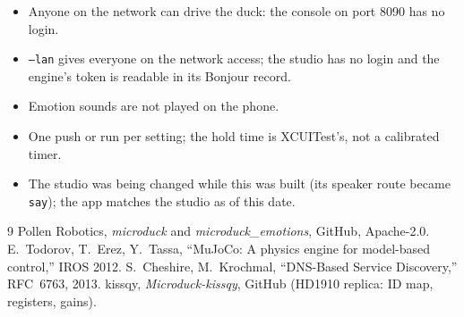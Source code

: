 \documentclass[11pt]{article}
\begin{document}
\begin{itemize}
kick has no policy installed on this duck; the runtime will refuse it.
\item Anyone on the network can drive the duck: the console on port 8090 has no login.
\item \texttt{--lan} gives everyone on the network access; the studio has no login and the engine's token is
readable in its Bonjour record.
\item Emotion sounds are not played on the phone.
\item One push or run per setting; the hold time is XCUITest's, not a calibrated timer.
\item The studio was being changed while this was built (its speaker route became \texttt{say}); the app matches
the studio as of this date.
\end{itemize}

\begin{thebibliography}{9}
 Pollen Robotics, \emph{microduck} and \emph{microduck\_emotions}, GitHub, Apache-2.0.
 E.~Todorov, T.~Erez, Y.~Tassa, ``MuJoCo: A physics engine for model-based control,'' IROS 2012.
 S.~Cheshire, M.~Krochmal, ``DNS-Based Service Discovery,'' RFC~6763, 2013.
 kissqy, \emph{Microduck-kissqy}, GitHub (HD1910 replica: ID map, registers, gains).
\end{thebibliography}
\end{document}
